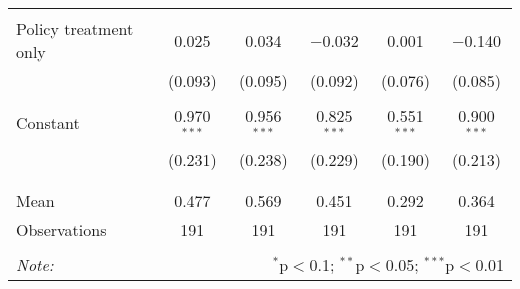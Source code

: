 \begin{tabular}{@{\extracolsep{5pt}}lccccc}
  & & & & & \\ 
 Policy treatment only & 0.025 & 0.034 & $-$0.032 & 0.001 & $-$0.140 \\ 
  & (0.093) & (0.095) & (0.092) & (0.076) & (0.085) \\ 
  & & & & & \\ 
 Constant & 0.970$^{***}$ & 0.956$^{***}$ & 0.825$^{***}$ & 0.551$^{***}$ & 0.900$^{***}$ \\ 
  & (0.231) & (0.238) & (0.229) & (0.190) & (0.213) \\ 
  & & & & & \\ 
\hline \\[-1.8ex] 
Mean & 0.477 & 0.569 & 0.451 & 0.292 & 0.364 \\ 
Observations & 191 & 191 & 191 & 191 & 191 \\ 
\hline 
\hline \\[-1.8ex] 
\textit{Note:}  & \multicolumn{5}{r}{$^{*}$p$<$0.1; $^{**}$p$<$0.05; $^{***}$p$<$0.01} \\ 
\end{tabular} 
